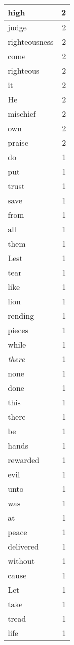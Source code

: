 \begin{center}
\begin{longtable}{l|r}
high & 2 \\ \hline
judge & 2 \\ \hline
righteousness & 2 \\ \hline
come & 2 \\ \hline
righteous & 2 \\ \hline
it & 2 \\ \hline
He & 2 \\ \hline
mischief & 2 \\ \hline
own & 2 \\ \hline
praise & 2 \\ \hline
do & 1 \\ \hline
put & 1 \\ \hline
trust & 1 \\ \hline
save & 1 \\ \hline
from & 1 \\ \hline
all & 1 \\ \hline
them & 1 \\ \hline
Lest & 1 \\ \hline
tear & 1 \\ \hline
like & 1 \\ \hline
lion & 1 \\ \hline
rending & 1 \\ \hline
pieces & 1 \\ \hline
while & 1 \\ \hline
\emph{there} & 1 \\ \hline
none & 1 \\ \hline
done & 1 \\ \hline
this & 1 \\ \hline
there & 1 \\ \hline
be & 1 \\ \hline
hands & 1 \\ \hline
rewarded & 1 \\ \hline
evil & 1 \\ \hline
unto & 1 \\ \hline
was & 1 \\ \hline
at & 1 \\ \hline
peace & 1 \\ \hline
delivered & 1 \\ \hline
without & 1 \\ \hline
cause & 1 \\ \hline
Let & 1 \\ \hline
take & 1 \\ \hline
tread & 1 \\ \hline
life & 1 \\ \hline

\end{longtable}
\end{center}
